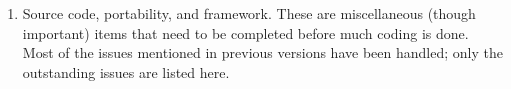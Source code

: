 \documentclass{article}
\begin{document}
\begin{enumerate}
\begin{enumerate}
  \end{enumerate}
\item Source code, portability, and framework.
  These are miscellaneous (though important) items that need to be completed
  before much coding is done.  Most of the issues mentioned in
  previous versions have been handled; only the outstanding issues are
  listed here.


\end{enumerate}
\end{document}
